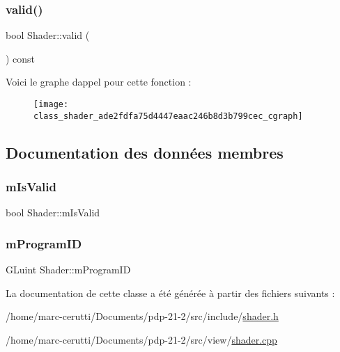 \subsubsection{\texorpdfstring{valid()}{valid()}}
{\footnotesize\ttfamily bool Shader\+::valid (\begin{DoxyParamCaption}{ }\end{DoxyParamCaption}) const\hspace{0.3cm}{\ttfamily [inline]}}

Voici le graphe d\textquotesingle{}appel pour cette fonction \+:\nopagebreak
\begin{figure}[H]
\begin{center}
\leavevmode
\texttt{[image: class\_shader\_ade2fdfa75d4447eaac246b8d3b799cec\_cgraph]}
\end{center}
\end{figure}


\subsection{Documentation des données membres}
\mbox{\label{class_shader_a2cf5f11fb1cfd53e9106285b6b9da0b4}} 
\subsubsection{\texorpdfstring{m\+Is\+Valid}{mIsValid}}
{\footnotesize\ttfamily bool Shader\+::m\+Is\+Valid\hspace{0.3cm}{\ttfamily [protected]}}

\mbox{\label{class_shader_ad3c569bb2c0755c647ca139863d44b55}} 
\subsubsection{\texorpdfstring{m\+Program\+ID}{mProgramID}}
{\footnotesize\ttfamily G\+Luint Shader\+::m\+Program\+ID\hspace{0.3cm}{\ttfamily [protected]}}



La documentation de cette classe a été générée à partir des fichiers suivants \+:\begin{DoxyCompactItemize}
\item 
/home/marc-\/cerutti/\+Documents/pdp-\/21-\/2/src/include/\hyperlink{shader_8h}{shader.\+h}\item 
/home/marc-\/cerutti/\+Documents/pdp-\/21-\/2/src/view/\hyperlink{shader_8cpp}{shader.\+cpp}\end{DoxyCompactItemize}
